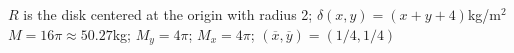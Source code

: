 {$R$ is the disk centered at the origin with radius 2; $\delta(x,y) = (x+y+4)$kg/m$^2$
}
{$M = 16\pi\approx 50.27$kg; $M_y= 4\pi$; $M_x = 4\pi$; $(\overline{x},\overline{y}) = (1/4,1/4)$
}